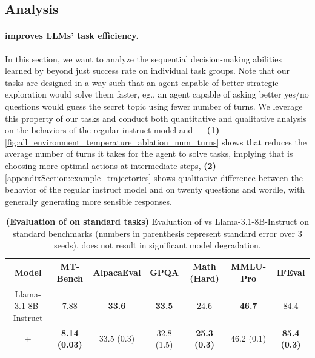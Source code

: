 \subsection{Analysis}


\paragraph{\ours{} improves LLMs' task efficiency.} In this section, we want to analyze the sequential decision-making abilities learned by \ours{} beyond just success rate on individual task groups. Note that our tasks are designed in a way such that an agent capable of better strategic exploration would solve them faster, eg., an agent capable of asking better yes/no questions would guess the secret topic using fewer number of turns. We leverage this property of our tasks and conduct both quantitative and qualitative analysis on the behaviors of the regular instruct model and \ours{} --- \textbf{(1)} \cref{fig:all_environment_temperature_ablation_num_turns} shows that \ours{} reduces the average number of turns it takes for the agent to solve tasks, implying that \ours{} is choosing more optimal actions at intermediate steps,  \textbf{(2)} \cref{appendixSection:example_trajectories} shows qualitative difference between the behavior of the regular instruct model and \ours{} on twenty questions and wordle, with \ours{} generally generating more sensible responses.

\begin{table}
    \centering
        \caption{\footnotesize \textbf{(Evaluation of \ours{} on standard tasks)} Evaluation of \ours{} vs Llama-3.1-8B-Instruct on standard benchmarks (numbers in parenthesis represent standard error over 3 seeds). \ours{} does not result in significant model degradation.}
        \vspace{0.2cm}
        \begin{tabular}{c|cccccc}
            \toprule
            Model & MT-Bench & AlpacaEval & GPQA & Math (Hard) & MMLU-Pro & IFEval \\
            \midrule
             Llama-3.1-8B-Instruct & 7.88 & \textbf{33.6} & \textbf{33.5} & 24.6 & \textbf{46.7} & 84.4\\
             + \ours{} & \textbf{8.14 (0.03)} & 33.5 (0.3) & 32.8 (1.5) & \textbf{25.3 (0.3)} & 46.2 (0.1) & \textbf{85.4 (0.3)} \\
             \bottomrule
        \end{tabular}
    \vspace{-0.2cm}
    \label{tab:mt_bench_eval}
\end{table}

